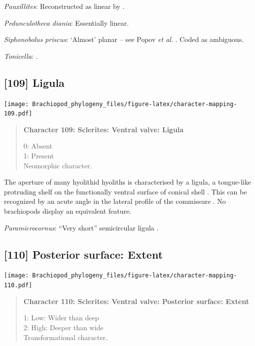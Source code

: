 \documentclass[openany]{book}
\begin{document}
\hypertarget{Pauxillites-coding-108}{}
\emph{Pauxillites}: Reconstructed as linear by \citet{Marek1976}.

\hypertarget{Pedunculotheca_diania-coding-108}{}
\emph{Pedunculotheca diania}: Essentially linear.

\hypertarget{Siphonobolus_priscus-coding-108}{}
\emph{Siphonobolus priscus}: `Almost' planar -- see Popov \emph{et al}.
\citeyearpar[fig. 4]{Popov2009Earlyontogeny}. Coded as ambiguous.

\hypertarget{Tonicella-coding-108}{}
\emph{Tonicella}: \citep{Schwabe2010}.

\subsection*{{[}109{]} Ligula}\label{ligula}

\texttt{[image: Brachiopod\_phylogeny\_files/figure-latex/character-mapping-109.pdf]}

\begin{quote}
\textbf{Character 109: Sclerites: Ventral valve: Ligula}

0: Absent\\
1: Present\\
Neomorphic character.
\end{quote}

The aperture of many hyolithid hyoliths is characterised by a ligula, a
tongue-like protruding shelf on the functionally ventral surface of
conical shell \citep{MartiMus2005}. This can be recognized by an acute
angle in the lateral profile of the commissure \citep[see second figure
on p.~91 of][]{Marek1966}. No brachiopods display an equivalent feature.

\hypertarget{Paramicrocornus-coding-109}{}
\emph{Paramicrocornus}: ``Very short'' semicircular ligula
\citep{Zhang2018Ahyolithid}.

\subsection*{{[}110{]} Posterior surface:
Extent}\label{posterior-surface-extent}

\texttt{[image: Brachiopod\_phylogeny\_files/figure-latex/character-mapping-110.pdf]}

\begin{quote}
\textbf{Character 110: Sclerites: Ventral valve: Posterior surface:
Extent}

1: Low: Wider than deep\\
2: High: Deeper than wide\\
Transformational character.
\end{quote}
\end{document}
